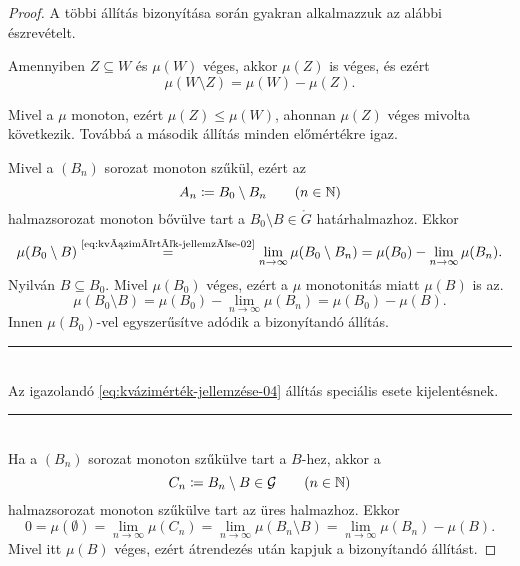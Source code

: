 \documentclass[
]{elteikthesis}[2024/04/26]
\begin{document}
\begin{proof}
		\newpage

		A többi állítás bizonyítása során gyakran alkalmazzuk az alábbi észrevételt.
		
		\begin{lem*}
			Amennyiben \( Z \subseteq W \) és \( \mu(W) \) véges,
			akkor \( \mu(Z) \) is véges, és ezért
			\[
				\mu(W \setminus Z) = \mu(W) - \mu(Z).
			\]
		\end{lem*}
		\begin{proof*}
			Mivel a \( \mu \) monoton, ezért \( \mu(Z) \leq \mu(W) \), 
			ahonnan \( \mu(Z) \) véges mivolta következik.
			Továbbá a második állítás minden előmértékre igaz.
		\end{proof*}
		
		\fbox{\ref{eq:kvázimérték-jellemzése-02} \( \Longrightarrow \)
			  \ref{eq:kvázimérték-jellemzése-03}}
		Mivel a \( (B_n) \) sorozat monoton szűkül, ezért az 
		\[
			A_n \coloneq B_0 \setminus B_n \qquad (n \in \mathbb{N})
		\]
		halmazsorozat monoton bővülve tart a \( B_0 \setminus B \in \ring{G} \) határhalmazhoz.
		Ekkor
		\[
			\mu(B_0 \setminus B) \overset{\text{\ref{eq:kvázimérték-jellemzése-02}}}{=}
			\lim_{n \to \infty} \mu(B_0 \setminus B_n) =
			\mu(B_0) - \lim_{n \to \infty} \mu(B_n).
		\]
		Nyilván \( B \subseteq B_0 \). 
		Mivel \( \mu(B_0) \) véges, ezért a \( \mu \) monotonitás miatt \( \mu(B) \) is az.
		\[
			\mu(B_0 \setminus B) =
			\mu(B_0) - \lim_{n \to \infty} \mu(B_n) =
			\mu(B_0) - \mu(B).
		\]
		Innen \( \mu(B_0) \)-vel egyszerűsítve adódik a bizonyítandó állítás.
		
		\noindent\rule{\linewidth}{0.4pt}\\
		
		\fbox{\ref{eq:kvázimérték-jellemzése-03} \( \Longrightarrow \)
			  \ref{eq:kvázimérték-jellemzése-04}}
		Az igazolandó \ref{eq:kvázimérték-jellemzése-04} állítás speciális esete \az{\ref{eq:kvázimérték-jellemzése-03}} kijelentésnek.
		
		\noindent\rule{\linewidth}{0.4pt}\\
		
		\fbox{\ref{eq:kvázimérték-jellemzése-04} \( \Longrightarrow \)
			  \ref{eq:kvázimérték-jellemzése-03}}
		Ha a \( (B_n) \) sorozat monoton szűkülve tart a \( B \)-hez, akkor a
		\[
			C_n \coloneq B_n \setminus B \in \mathcal{G} \qquad (n \in \mathbb{N})
		\]
		halmazsorozat monoton szűkülve tart az üres halmazhoz.
		Ekkor
		\[
			0 = 
			\mu( \emptyset ) =
			\lim_{n \to \infty} \mu( C_n ) =
			\lim_{n \to \infty} \mu( B_n \setminus B ) =
			\lim_{n \to \infty} \mu( B_n ) - \mu(B).
		\]
		Mivel itt \( \mu(B) \) véges, ezért átrendezés után kapjuk a bizonyítandó állítást.
		

\end{proof}
\end{document}
